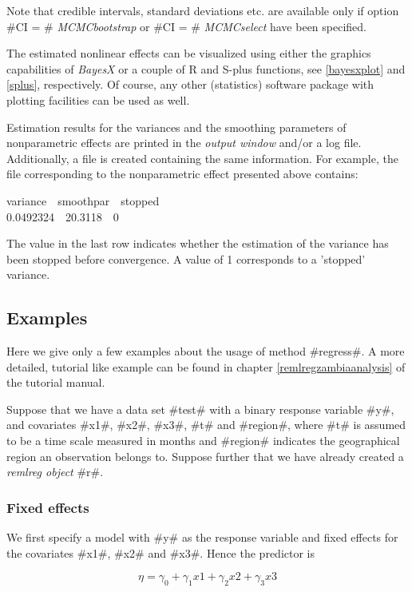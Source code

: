 Note that credible intervals, standard deviations etc. are available only
if option #CI = # {\em MCMCbootstrap} or
#CI = # {\em MCMCselect} have been specified.

The estimated nonlinear effects can be visualized using either the
graphics capabilities of {\em BayesX} or a couple of R and S-plus
functions,  see \autoref{bayesxplot} and \autoref{splus},
respectively. Of course, any other (statistics) software package
with plotting facilities can be used as well.

Estimation results for the variances and the smoothing parameters
of nonparametric effects are printed in the {\em output window}
and/or a log file. Additionally, a file is created containing the
same information. For example, the file corresponding to the
nonparametric effect presented above contains:

\footnotesize
 variance \,\, smoothpar \,\, stopped\\
 0.0492324 \,\, 20.3118 \,\, 0
\normalsize

The value in the last row indicates whether the estimation of the
variance has been stopped before convergence. A value of 1
corresponds to a 'stopped' variance.

\subsection{Examples}

Here we give only a few examples about the usage of method
#regress#. A more detailed, tutorial like example can be found in
chapter \ref*{remlregzambiaanalysis} of the tutorial manual.

Suppose that we have a data set #test# with a binary response
variable #y#, and covariates #x1#, #x2#, #x3#, #t# and #region#,
where #t# is assumed to be a time scale measured in months and
#region# indicates the geographical region an observation belongs
to. Suppose further that we have already created a {\em remlreg
object} #r#.

\subsubsection*{Fixed effects}

We first specify a model with #y# as the response variable and
fixed effects for the covariates #x1#, #x2# and #x3#. Hence the
predictor is

$$
\eta = \gamma_0 + \gamma_1 x1 + \gamma_2 x2 + \gamma_3 x3
$$

